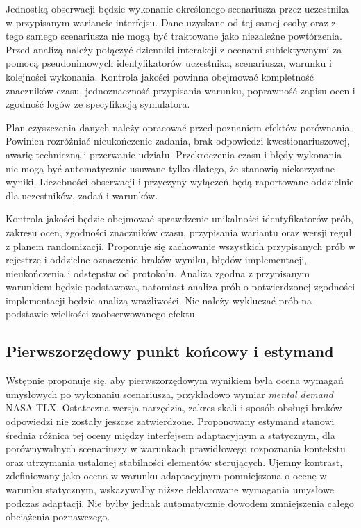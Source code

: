 \documentclass[11pt,a4paper]{article}
\begin{document}
Jednostką obserwacji będzie wykonanie określonego scenariusza przez uczestnika w przypisanym wariancie interfejsu. Dane uzyskane od tej samej osoby oraz z tego samego scenariusza nie mogą być traktowane jako niezależne powtórzenia. Przed analizą należy połączyć dzienniki interakcji z ocenami subiektywnymi za pomocą pseudonimowych identyfikatorów uczestnika, scenariusza, warunku i kolejności wykonania. Kontrola jakości powinna obejmować kompletność znaczników czasu, jednoznaczność przypisania warunku, poprawność zapisu ocen i zgodność logów ze specyfikacją symulatora.

Plan czyszczenia danych należy opracować przed poznaniem efektów porównania. Powinien rozróżniać nieukończenie zadania, brak odpowiedzi kwestionariuszowej, awarię techniczną i przerwanie udziału. Przekroczenia czasu i błędy wykonania nie mogą być automatycznie usuwane tylko dlatego, że stanowią niekorzystne wyniki. Liczebności obserwacji i przyczyny wyłączeń będą raportowane oddzielnie dla uczestników, zadań i warunków.

Kontrola jakości będzie obejmować sprawdzenie unikalności identyfikatorów prób, zakresu ocen, zgodności znaczników czasu, przypisania wariantu oraz wersji reguł z planem randomizacji. Proponuje się zachowanie wszystkich przypisanych prób w rejestrze i oddzielne oznaczenie braków wyniku, błędów implementacji, nieukończenia i odstępstw od protokołu. Analiza zgodna z przypisanym warunkiem będzie podstawowa, natomiast analiza prób o potwierdzonej zgodności implementacji będzie analizą wrażliwości. Nie należy wykluczać prób na podstawie wielkości zaobserwowanego efektu.

\subsection{Pierwszorzędowy punkt końcowy i estymand}

Wstępnie proponuje się, aby pierwszorzędowym wynikiem była ocena wymagań umysłowych po wykonaniu scenariusza, przykładowo wymiar \textit{mental demand} NASA-TLX. Ostateczna wersja narzędzia, zakres skali i sposób obsługi braków odpowiedzi nie zostały jeszcze zatwierdzone. Proponowany estymand stanowi średnia różnica tej oceny między interfejsem adaptacyjnym a statycznym, dla porównywalnych scenariuszy w warunkach prawidłowego rozpoznania kontekstu oraz utrzymania ustalonej stabilności elementów sterujących. Ujemny kontrast, zdefiniowany jako ocena w warunku adaptacyjnym pomniejszona o ocenę w warunku statycznym, wskazywałby niższe deklarowane wymagania umysłowe podczas adaptacji. Nie byłby jednak automatycznie dowodem zmniejszenia całego obciążenia poznawczego.
\end{document}
